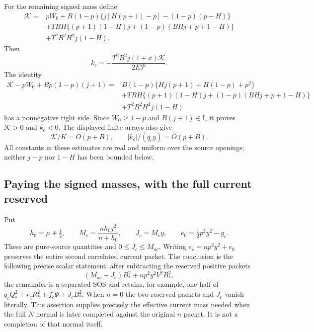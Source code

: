 For the remaining signed mass define
\begin{align*}
\mathcal K={}&pW_0+
 B(1-p)\{j[H(p+1)-p]-(1-p)(p-H)\}\\
 &+TBH\{(p+1)(1-H)j+(1-p)(BHj+p+1-H)\}\\
 &+T^2B^2H^2j(1-H).
 \tag{RSR18}
\end{align*}
Then
\[
 k_c=-\frac{T^2B^2j(1+x)\mathcal K}{2E\mathcal P}.
\]
The identity
\begin{align*}
\mathcal K-pW_0+Bp(1-p)(j+1)
={}&B(1-p)\{Hj(p+1)+H(1-p)+p^2\}\\
 &+TBH\{(p+1)(1-H)j+(1-p)(BHj+p+1-H)\}\\
 &+T^2B^2H^2j(1-H)
 \tag{RSR19}
\end{align*}
has a nonnegative right side. Since $W_0\geq1-p$ and
$B(j+1)\in\mathrm I$, it proves $\mathcal K>0$ and $k_c<0$.
The displayed finite arrays also give
\[
 \mathcal K/K=O(p+B),\qquad
 |k_c|/(q_cy)=O(p+B).
 \tag{RSR20}
\]
All constants in these estimates are real and uniform over the source
openings; neither $j-p$ nor $1-H$ has been bounded below.

\subsection{Paying the signed masses, with the full current reserved}

Put
\[
 h_0=\mu+\tfrac12,\qquad
 M_e=\frac{nh_0j^2}{n+h_0},\qquad J_c=M_ey,
 \qquad e_0=\tfrac12p^2y^2-g_c.
 \tag{RSR21}
\]
These are pure-source quantities and $0\leq J_c\leq M_{ac}$.
Writing $e_c=np^2y^2+e_0$ preserves the entire second correlated
current packet. The conclusion is the following precise scalar
statement: after subtracting the reserved positive packets
\[
 (M_{ac}-J_c)B_*^2+np^2y^2V^2B_*^2,
 \tag{RSR22}
\]
the remainder is a separated SOS and retains, for example, one half
of $q_cQ_*^2+r_cR_*^2+f_c\Psi+J_cB_*^2$.
When $n=0$ the two reserved packets and $J_c$ vanish literally.
This assertion supplies precisely the effective current mass needed
when the full $N$ normal is later completed against the original $n$
packet. It is not a completion of that normal itself.


